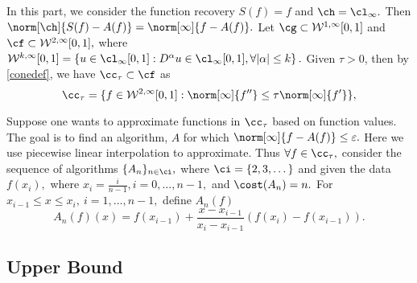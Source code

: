 
In this part, we consider the function recovery $S(f)=f$ and $\ch=\cl_{\infty}.$
Then $\norm[\ch]{S(f)-A(f)}=\norm[\infty]{f-A(f)}.$
Let $\cg \subset \mathcal{W}^{1,\infty}[0,1]$ and $\cf \subset \mathcal{W}^{2,\infty}[0,1],$ where
$\mathcal{W}^{k,\infty}[0,1]=\left\{u \in \cl_{\infty}[0,1]:D^\alpha u \in \cl_\infty[0,1], \forall |\alpha| \leq k \right\}.$
Given $\tau>0$, then by \eqref{conedef}, we have $\cc_{\tau} \subset \cf$ as
\begin{equation}\label{taudef}
\cc_{\tau}=\{f \in  \mathcal{W}^{2,\infty}[0,1] : \norm[\infty]{f''}\leq \tau\norm[\infty]{f'}\},
\end{equation}

Suppose one wants to approximate functions in $\cc_{\tau}$ based on function values.  The goal is to find an algorithm, $A$ for which $\norm[\infty]{f-A(f)} \le \varepsilon.$ Here we use piecewise linear interpolation to approximate. Thus $\forall f \in \cc_{\tau},$ consider the sequence of algorithms $\{A_n\}_{n \in \ci},$ where
$\ci=\{2,3,\dots\}$
 and given the data $f(x_i),$ where $ x_i=\frac{i}{n-1}, i=0, \ldots,n-1,$ and $\cost(A_{n})=n.$
For $x_{i-1} \leq x \leq x_i, \ i=1, \ldots, n-1,$ define $A_{n}(f)$
$$A_{n}(f)(x)=f(x_{i-1})+\frac{x-x_{i-1}}{x_i-x_{i-1}}\left(f(x_i)-f(x_{i-1})\right).$$

\subsection{Upper Bound}




